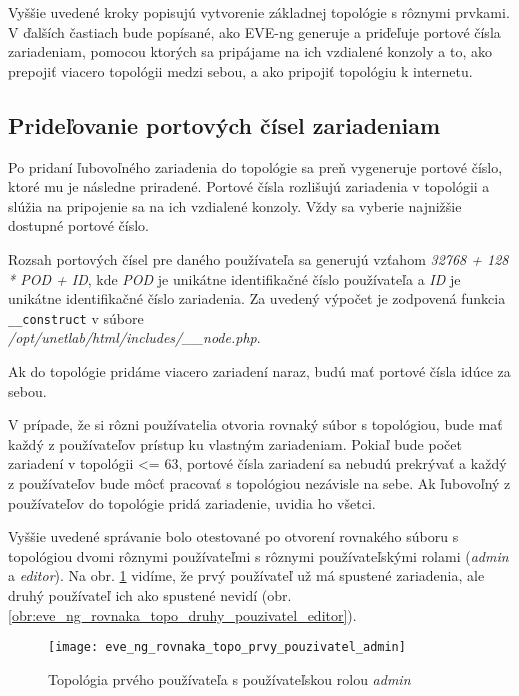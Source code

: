 Vyššie uvedené kroky popisujú vytvorenie základnej topológie s rôznymi prvkami. V ďalších častiach bude popísané, ako EVE-ng generuje a priďeľuje portové čísla zariadeniam, pomocou ktorých sa pripájame na ich vzdialené konzoly a to, ako prepojiť viacero topológii medzi sebou, a ako pripojiť topológiu k internetu.




\subsection{Prideľovanie portových čísel zariadeniam}
\label{chap:priradovanie_portovych_cisel}

Po pridaní ľubovoľného zariadenia do topológie sa preň vygeneruje portové číslo, ktoré mu je následne priradené. Portové čísla rozlišujú zariadenia v topológii a  slúžia na pripojenie sa na ich vzdialené konzoly. Vždy sa vyberie najnižšie dostupné portové číslo.

Rozsah portových čísel pre daného používateľa sa generujú vzťahom \emph{32768 + 128 * POD + ID}, kde \emph{POD} je unikátne identifikačné číslo používateľa a \emph{ID} je unikátne identifikačné číslo zariadenia. Za uvedený výpočet je zodpovená funkcia \texttt{\_\_construct} v súbore \\ \emph{/opt/unetlab/html/includes/\_\_node.php}.

Ak do topológie pridáme viacero zariadení naraz, budú mať portové čísla idúce za sebou.

V prípade, že si rôzni používatelia otvoria rovnaký súbor s topológiou, bude mať každý z používateľov prístup ku vlastným zariadeniam. Pokiaľ bude počet zariadení v topológii <= 63, portové čísla zariadení sa nebudú prekrývať a každý z používateľov bude môcť pracovať s topológiou nezávisle na sebe. Ak ľubovoľný z používateľov do topológie pridá zariadenie, uvidia ho všetci.

Vyššie uvedené správanie bolo otestované po otvorení rovnakého súboru s topológiou dvomi rôznymi používateľmi s rôznymi používateľskými rolami (\emph{admin} a \emph{editor}). Na obr. \ref{obr:eve_ng_rovnaka_topo_prvy_pouzivatel_admin} vidíme, že prvý používateľ už má spustené zariadenia, ale druhý používateľ ich ako spustené nevidí (obr. \ref{obr:eve_ng_rovnaka_topo_druhy_pouzivatel_editor}).

\begin{figure}
    \centering
    \texttt{[image: eve\_ng\_rovnaka\_topo\_prvy\_pouzivatel\_admin]}
    \caption{Topológia prvého používateľa s používateľskou rolou \emph{admin}}
    \label{obr:eve_ng_rovnaka_topo_prvy_pouzivatel_admin}
\end{figure}

